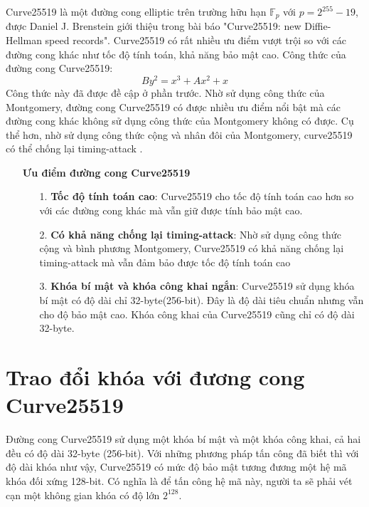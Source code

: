 \documentclass[a4paper,12pt]{report}
\begin{document}
Curve25519 là một đường cong elliptic trên trường hữu hạn $\mathbb{F}_p$ với $p = 2^{255} - 19$, được Daniel J. Brenstein giới thiệu trong bài báo "Curve25519: new Diffie-Hellman speed records". Curve25519 có rất nhiều ưu điểm vượt trội so với các đường cong khác như tốc độ tính toán,
khả năng bảo mật cao. Công thức của đường cong Curve25519:
\begin{displaymath}
By^2 = x^3 + Ax^2 + x
\end{displaymath}
Công thức này đã được đề cập ở phần trước. Nhờ sử dụng công thức của Montgomery, đường cong Curve25519 có được nhiều ưu điểm nổi bật mà các đường cong khác không sử dụng công thức của Montgomery không có được. Cụ
thể hơn, nhờ sử dụng công thức cộng và nhân đôi của Montgomery, curve25519 có thể chống lại timing-attack .
\begin{itemize}
\item[] \textbf{Ưu điểm đường cong Curve25519}
\begin{itemize}
\item[1. ] \textbf{Tốc độ tính toán cao}: Curve25519 cho tốc độ tính toán cao hơn so với các đường cong khác mà vẫn giữ được tính bảo mật cao.
\item[2. ] \textbf{Có khả năng chống lại timing-attack}: Nhờ sử dụng công thức cộng và bình phương Montgomery, Curve25519 có khả năng chống lại timing-attack mà vẫn đảm bảo được tốc độ tính toán cao
\item[3. ] \textbf{Khóa bí mật và khóa công khai ngắn}: Curve25519 sử dụng khóa bí mật có độ dài chỉ 32-byte(256-bit). Đây là độ dài tiêu chuẩn nhưng vẫn cho độ bảo mật cao. Khóa công khai của Curve25519 cũng chỉ có độ dài 32-byte.
\end{itemize}
\end{itemize}
\section{Trao đổi khóa với đương cong Curve25519}
Đường cong Curve25519 sử dụng một khóa bí mật và một khóa công khai, cả hai đều có độ dài 32-byte (256-bit). Với những phương pháp tấn công đã biết thì với độ dài khóa như vậy, Curve25519 có mức độ bảo mật tương đương một hệ mã khóa đối xứng 128-bit. Có nghĩa là để tấn công hệ mã này, người ta sẽ phải vét cạn một không gian khóa có độ lớn $2^128$.
\end{document}
